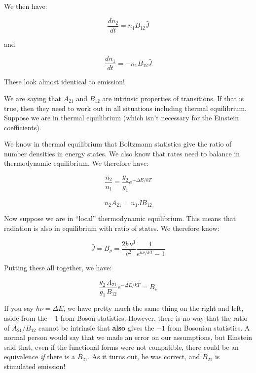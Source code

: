 \documentclass{article}
\begin{document}
We then have:

\begin{equation}
    \frac{d n_2}{dt} = n_1 B_{12} \bar{J}
\end{equation}

and

\begin{equation}
    \frac{d n_1}{dt} = -n_1 B_{12} \bar{J}
\end{equation}

These look almost identical to emission! 

We are saying that $A_{21}$ and $B_{12}$ are intrinsic properties of transitions. If that is true, then they need to work out in all situations including thermal equilibrium. Suppose we are in thermal equilibrium (which isn't necessary for the Einstein coefficients).

We know in thermal equilibrium that Boltzmann statistics give the ratio of number densities in energy states. We also know that rates need to balance in thermodynamic equilibrium. We therefore have:

\begin{equation}
    \frac{n_2}{n_1} = \frac{g_2}{g_1} e^{-\Delta E/kT}
\end{equation}

\begin{equation}
    n_2 A_{21} = n_1 \bar{J} B_{12}
\end{equation}

Now suppose we are in ``local'' thermodynamic equilibrium. This means that radiation is also in equilibrium with ratio of states. We therefore know:

\begin{equation}
    \bar{J} = B_\nu = \frac{2 h \nu^3}{c^2} \frac{1}{e^{h\nu/ kT} - 1}
\end{equation}

Putting these all together, we have:

\begin{equation}
    \frac{g_2}{g_1} \frac{A_{21}}{B_{12}} e^{- \Delta E/kT} = B_\nu
\end{equation}

If you say $h\nu = \Delta E$, we have pretty much the same thing on the right and left, aside from the $-1$ from Boson statistics. However, there is no way that the ratio of $A_{21}/B_{12}$ cannot be intrinsic that \textbf{also} gives the $-1$ from Bosonian statistics. A normal person would say that we made an error on our assumptions, but Einstein said that, even if the functional forms were not compatible, there could be an equivalence \textit{if} there is a $B_{21}$. As it turns out, he was correct, and $B_{21}$ is stimulated emission!\\
\end{document}
